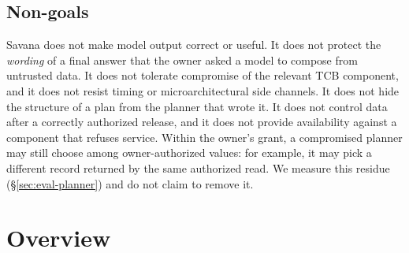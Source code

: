 \documentclass[letterpaper,twocolumn,10pt]{article}
\newcommand{\sys}{Savana}
\begin{document}
\subsection{Non-goals}

\sys{} does not make model output correct or useful. It does not protect
the \emph{wording} of a final answer that the owner asked a model to compose
from untrusted data. It does not tolerate compromise of the relevant TCB
component, and it does not resist timing or microarchitectural side
channels. It does not hide the structure of a plan from the planner that
wrote it. It does not control data after a correctly authorized release,
and it does not provide availability against a component that refuses
service. Within the owner's grant, a compromised planner may still choose
among owner-authorized values: for example, it may pick a different record
returned by the same authorized read. We measure this residue
(\S\ref{sec:eval-planner}) and do not claim to remove it.

\section{Overview}
\label{sec:overview}
\end{document}
